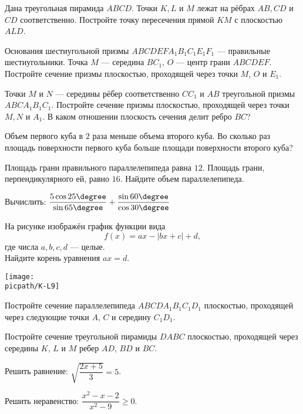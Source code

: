 \begin{class}[number=7]
	\begin{listofex}
		\item Дана треугольная пирамида \(ABCD\). Точки \(K, L\) и \(M\) лежат на рёбрах \(AB, CD\) и \(CD\) соответственно. Постройте точку пересечения прямой \(KM\) с плоскостью \(ALD\).
		\item Основания шестиугольной призмы \( ABCDEFA_1B_1C_1E_1F_1 \) --- правильные шестиугольники. Точка \( M \) --- середина \( BC_1 \), \( O \) --- центр грани \( ABCDEF \). Постройте сечение призмы плоскостью, проходящей через точки \( M \), \( O \) и \( E_1 \).
		\item Точки \(M\) и \(N\) --- середины рёбер соответственно \(CC_1\) и \(AB\) треугольной призмы \(ABCA_1B_1C_1\). Постройте сечение призмы плоскостью, проходящей через точки \(M, N\) и \(A_1\). В каком отношении плоскость сечения делит ребро \(BC\)?
		\item Объем первого куба в \( 2 \) раза меньше объема второго куба. Во сколько раз площадь поверхности первого куба больше площади поверхности второго куба?
		\item Площадь грани правильного параллелепипеда равна \( 12 \). Площадь грани, перпендикулярного ей, равно \(16\). Найдите объем параллелепипеда.
		\item Вычислить: \( \dfrac{5\cos 25\degree}{\sin 65\degree}+\dfrac{\sin 60\degree}{\cos 30\degree} \)
	\end{listofex}
\end{class}

\begin{homework}[number=1]
	\begin{listofex}
		\item
		\begin{minipage}[t]{\bodywidth}
			На рисунке изображён график функции вида \[ f(x)=ax-|bx+c|+d, \] где числа \(a, b, c, d\) --- целые.\\ Найдите корень уравнения \(ax=d\).
		\end{minipage}
		\hspace{0.02\linewidth}
		\begin{minipage}[t]{\picwidth}
			\texttt{[image: \\picpath/K-L9]}
		\end{minipage}
		\item Постройте сечение параллелепипеда \( ABCDA_1B_1C_1D_1 \)
		плоскостью, проходящей через следующие точки \( A \), \( C \) и середину \( C_1D_1 \).
		\item Постройте сечение треугольной пирамиды \( DABC \) плоскостью,
		проходящей через середины \( K \), \( L \) и \( M \) ребер \( AD \), \( BD \) и \( BC \).
		\item Решить равнение: \( \sqrt{\dfrac{2x+5}{3}}=5 \).
		\item Решить неравенство: \( \dfrac{x^2-x-2}{x^2-9}\ge0 \).
	\end{listofex}
\end{homework}

